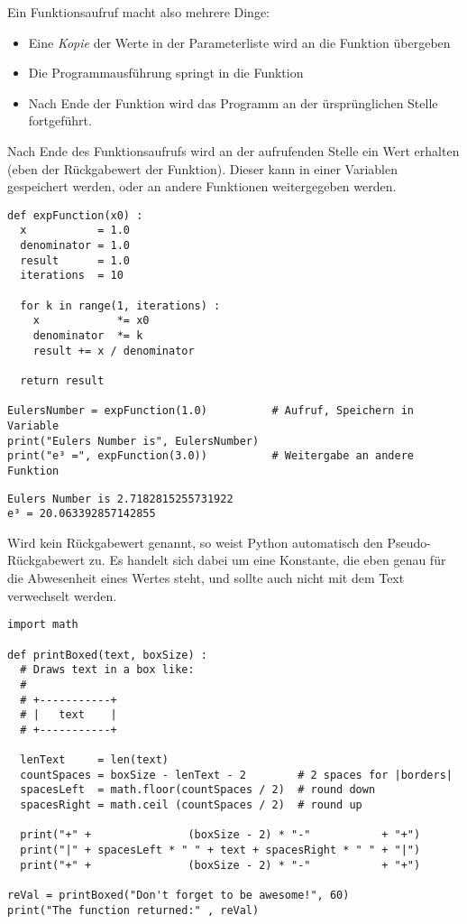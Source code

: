 Ein Funktionsaufruf macht also mehrere Dinge:
\begin{itemize}
\item Eine \emph{Kopie} der Werte in der Parameterliste wird an die Funktion übergeben
\item Die Programmausführung springt in die Funktion
\item Nach Ende der Funktion wird das Programm an der ürsprünglichen Stelle fortgeführt.
\end{itemize}
Nach Ende des Funktionsaufrufs wird an der aufrufenden Stelle ein Wert erhalten (eben der Rückgabewert der Funktion). Dieser kann in einer Variablen gespeichert werden, oder an andere Funktionen weitergegeben werden.

\begin{codebox}
\begin{verbatim}
def expFunction(x0) :
  x           = 1.0
  denominator = 1.0
  result      = 1.0
  iterations  = 10
  
  for k in range(1, iterations) :
    x            *= x0
    denominator  *= k
    result += x / denominator
    
  return result

EulersNumber = expFunction(1.0)          # Aufruf, Speichern in Variable
print("Eulers Number is", EulersNumber)
print("e³ =", expFunction(3.0))          # Weitergabe an andere Funktion
\end{verbatim}
\end{codebox}

\begin{cmdbox}
\begin{verbatim}
Eulers Number is 2.7182815255731922
e³ = 20.063392857142855
\end{verbatim}
\end{cmdbox}

Wird kein Rückgabewert genannt, so weist Python automatisch den Pseudo-Rückgabewert  zu. Es handelt sich dabei um eine Konstante, die eben genau für die Abwesenheit eines Wertes steht, und sollte auch nicht mit dem Text  verwechselt werden.
\begin{codebox}
\begin{verbatim}
import math

def printBoxed(text, boxSize) :
  # Draws text in a box like:
  #
  # +-----------+
  # |   text    |
  # +-----------+
  
  lenText     = len(text)
  countSpaces = boxSize - lenText - 2        # 2 spaces for |borders|
  spacesLeft  = math.floor(countSpaces / 2)  # round down
  spacesRight = math.ceil (countSpaces / 2)  # round up
  
  print("+" +               (boxSize - 2) * "-"           + "+")
  print("|" + spacesLeft * " " + text + spacesRight * " " + "|")
  print("+" +               (boxSize - 2) * "-"           + "+")
  
reVal = printBoxed("Don't forget to be awesome!", 60)
print("The function returned:" , reVal)
\end{verbatim}
\end{codebox}


